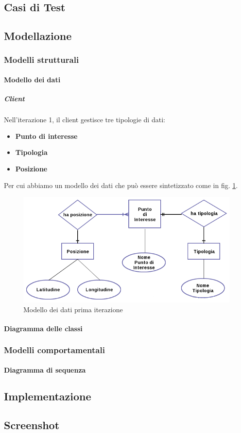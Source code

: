 \subsection{Casi di Test}
\subsection{Modellazione}
\subsubsection{Modelli strutturali}
\paragraph{Modello dei dati}
\subparagraph{Client}
Nell'iterazione 1, il client gestisce tre tipologie di dati:
\begin{itemize}
\item \textbf{Punto di interesse}
\item \textbf{Tipologia}
\item \textbf{Posizione}
\end{itemize}
Per cui abbiamo un modello dei dati che può essere sintetizzato come in fig. \ref{datamodel1iterazione}.
\begin{figure}
\includegraphics[scale=0.55]{imgs/model/DataModel1.png} 
\caption{Modello dei dati prima iterazione\label{datamodel1iterazione}}
\end{figure}

\paragraph{Diagramma delle classi}

\subsubsection{Modelli comportamentali}
\paragraph{Diagramma di sequenza}
\subsection{Implementazione}
\subsection{Screenshot}

\clearpage

\clearpage{\pagestyle{empty}\cleardoublepage}
